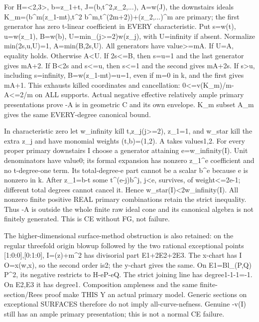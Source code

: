 \documentclass[11pt]{article}
\begin{document}
For H=\textless{}2,3\textgreater{}, b=z\_1+t, J=(b,t\textasciicircum{}2,z\_2,...), A=w(J), the downstairs ideals K\_m=(b\textasciicircum{}m(z\_1-mt),t\textasciicircum{}2 b\textasciicircum{}m,t\textasciicircum{}(2m+2))+(z\_2,...)\textasciicircum{}m are primary; the first generator has zero t-linear coefficient in EVERY characteristic. Put s=w(t), u=w(z\_1), B=w(b), U=min\_(j\textgreater{}=2)w(z\_j), with U=infinity if absent. Normalize min(2s,u,U)=1, A=min(B,2s,U). All generators have value\textgreater{}=mA. If U=A, equality holds. Otherwise A\textless{}U. If 2s\textless{}=B, then s=u=1 and the last generator gives mA+2. If B\textless{}2s and s\textless{}=u, then s\textless{}=1 and the second gives mA+2s. If s\textgreater{}u, including s=infinity, B=w(z\_1-mt)=u=1, even if m=0 in k, and the first gives mA+1. This exhausts killed coordinates and cancellation: 0\textless{}=v(K\_m)/m-A\textless{}=2/m on ALL supports. Actual negative effective relatively ample primary presentations prove -A is in geometric C and its own envelope. K\_m subset A\_m gives the same EVERY-degree canonical bound.

In characteristic zero let w\_infinity kill t,z\_j(j\textgreater{}=2), z\_1=1, and w\_star kill the extra z\_j and have monomial weights (t,b)=(1,2). A takes values1,2. For every proper primary downstairs I choose a generator attaining e=w\_infinity(I). Unit denominators have value0; its formal expansion has nonzero z\_1\textasciicircum{}e coefficient and no t-degree-one term. Its total-degree-e part cannot be a scalar b\textasciicircum{}e because e is nonzero in k. After z\_1=b-t some t\textasciicircum{}(e-j)b\textasciicircum{}j, j\textless{}e, survives, of weight\textless{}=2e-1; different total degrees cannot cancel it. Hence w\_star(I)\textless{}2w\_infinity(I). All nonzero finite positive REAL primary combinations retain the strict inequality. Thus -A is outside the whole finite raw ideal cone and its canonical algebra is not finitely generated. This is CE without FG, not failure.

The higher-dimensional surface-method obstruction is also retained: on the regular threefold origin blowup followed by the two rational exceptional points [1:0:0],[0:1:0], I=(z)+m\textasciicircum{}2 has divisorial part E1+2E2+2E3. The x-chart has I O=x(w,x), so the second order is2; the y-chart gives the same. On E1=Bl\_(P,Q) P\textasciicircum{}2, its negative restricts to H-eP-eQ. The strict joining line has degree1-1-1=-1. On E2,E3 it has degree1. Composition ampleness and the same finite-section/Rees proof make THIS Y an actual primary model. Generic sections on exceptional SURFACES therefore do not imply all-curve-nefness. Genuine -v(I) still has an ample primary presentation; this is not a normal CE failure.
\end{document}
